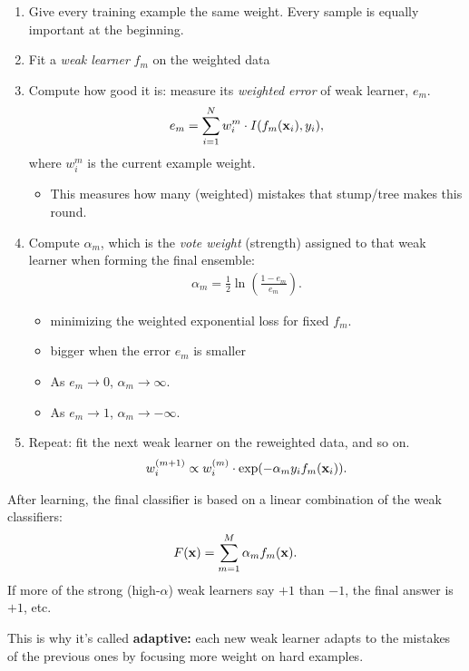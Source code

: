 \begin{enumerate}
	\item Give every training example the same weight. Every sample is equally important at the beginning.
	\item Fit a \textit{weak learner} $f_m$ on the weighted data
	\item Compute how good it is: measure its \textit{weighted error} of weak learner, $e_m$. 
		\begin{align*}
			e_m = \sum_{i=1}^{N}w_i^m \cdot I(f_m({\mathbf{x}}_i), y_i),
		\end{align*}
		where $w_i^m$ is the current example weight. 
		\begin{itemize}
			\item This measures how many (weighted) mistakes that stump/tree makes this round.
		\end{itemize}
	\item Compute $\alpha_m$, which is the \textit{vote weight} (strength) assigned to that weak learner when forming the final ensemble: 
		\begin{align*}
			\alpha_m = \frac{1}{2}\ln \left(\frac{1-e_m}{e_m}\right).
		\end{align*}
		\begin{itemize}
			\item minimizing the weighted exponential loss for fixed $f_m$.
			\item bigger when the error $e_m$ is smaller
			\item As $e_m\to 0$, $\alpha_m\to \infty$.
			\item As $e_m\to 1$, $\alpha_m\to -\infty$.
		\end{itemize}
	\item Repeat: fit the next weak learner on the reweighted data, and so on.
		\begin{align*}
			w_i^{(m+1)}\propto w_i^{(m)}\cdot \exp(-\alpha_m y_i f_m({\mathbf{x}}_i)).
		\end{align*}
\end{enumerate}

After learning, the final classifier is based on a linear combination of the weak classifiers:
\begin{align*}
	F({\mathbf{x}}) = \sum_{m=1}^M \alpha_mf_m({\mathbf{x}}).
\end{align*}
If more of the strong (high-$\alpha$) weak learners say $+1$ than $-1$, the final answer is $+1$, etc.

This is why it's called \textbf{adaptive:} each new weak learner adapts to the mistakes of the previous ones by focusing more weight on hard examples.


